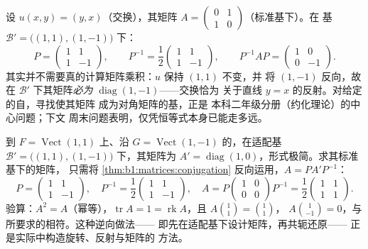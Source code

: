 \begin{example}[好的基使映射一目了然]
\label{ex:b1:matrices:conjugationrun}
设 $u(x, y) = (y, x)$（交换），其矩阵 $A = \begin{pmatrix} 0
& 1\\ 1 & 0\end{pmatrix}$（标准基下）。在
基 $\mathcal B' = \bigl((1,1), (1,-1)\bigr)$ 下：
\[
P = \begin{pmatrix} 1 & 1\\ 1 & -1 \end{pmatrix},
\qquad
P^{-1} = \frac12\begin{pmatrix} 1 & 1\\ 1 & -1 \end{pmatrix},
\qquad
P^{-1} A P = \begin{pmatrix} 1 & 0\\ 0 & -1 \end{pmatrix}.
\]
其实并不需要真的计算矩阵乘积：$u$ 保持 $(1,1)$ 不变，并
将 $(1,-1)$ 反向，故在 $\mathcal B'$ 下其矩阵\emph{必为}
$\operatorname{diag}(1, -1)$——交换恰为
关于直线 $y = x$ 的反射。对给定的自，寻找使其矩阵
成为对角矩阵的基，正是
本科二年级分册（约化理论）的中心问题；下文
周末问题表明，仅凭恒等式本身已能走多远。
\end{example}

\begin{example}
\label{ex:b1:matrices:reverserun}
到 $F = \operatorname{Vect}(1,1)$ 上、沿 $G =
\operatorname{Vect}(1,-1)$ 的，在适配基 $\mathcal
B' = \bigl((1,1),(1,-1)\bigr)$ 下，其矩阵为 $A' =
\operatorname{diag}(1, 0)$，形式极简。求其标准基下的矩阵，
只需将 \cref{thm:b1:matrices:conjugation} 反向运用，$A = P A'
P^{-1}$：
\[
P = \begin{pmatrix} 1 & 1\\ 1 & -1\end{pmatrix},
\quad
P^{-1} = \frac12\begin{pmatrix} 1 & 1\\ 1 & -1\end{pmatrix},
\quad
A = P\begin{pmatrix} 1 & 0\\ 0 & 0\end{pmatrix}P^{-1}
= \frac12\begin{pmatrix} 1 & 1\\ 1 & 1\end{pmatrix}.
\]
验算：$A^2 = A$（幂等），$\operatorname{tr} A = 1 =
\operatorname{rk} A$，且 $A\binom{1}{1} = \binom11$，
$A\binom{1}{-1} = 0$，与所要求的相符。这种逆向做法——
即先在适配基下设计矩阵，再共轭还原——
正是实际中构造旋转、反射与矩阵的
方法。
\end{example}

